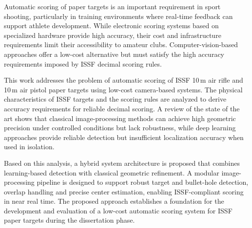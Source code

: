 Automatic scoring of paper targets is an important requirement in sport shooting, particularly
in training environments where real-time feedback can support athlete development. While
electronic scoring systems based on specialized hardware provide high accuracy, their cost and
infrastructure requirements limit their accessibility to amateur clubs. Computer-vision-based
approaches offer a low-cost alternative but must satisfy the high accuracy requirements
imposed by ISSF decimal scoring rules.

This work addresses the problem of automatic scoring of ISSF 10\,m air rifle and 10\,m air pistol
paper targets using low-cost camera-based systems. The physical characteristics of ISSF targets
and the scoring rules are analyzed to derive accuracy requirements for reliable decimal
scoring. A review of the state of the art shows that classical image-processing methods can
achieve high geometric precision under controlled conditions but lack robustness, while deep
learning approaches provide reliable detection but insufficient localization accuracy when used in
isolation.

Based on this analysis, a hybrid system architecture is proposed that combines learning-based
detection with classical geometric refinement. A modular image-processing pipeline is designed
to support robust target and bullet-hole detection, overlap handling and precise center
estimation, enabling ISSF-compliant scoring in near real time. The proposed approach establishes
a foundation for the development and evaluation of a low-cost automatic scoring system for
ISSF paper targets during the dissertation phase.

